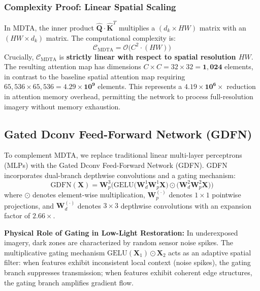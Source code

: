 \documentclass[10pt,twocolumn,letterpaper]{article}
\begin{document}
\subsubsection{Complexity Proof: Linear Spatial Scaling}
In MDTA, the inner product $\hat{\mathbf{Q}} \cdot \hat{\mathbf{K}}^T$ multiplies a $(d_k \times HW)$ matrix with an $(HW \times d_k)$ matrix. The computational complexity is:
\begin{equation}
\mathcal{C}_{\text{MDTA}} = \mathcal{O}\big( C^2 \cdot (HW) \big)
\end{equation}
Crucially, $\mathcal{C}_{\text{MDTA}}$ is \textbf{strictly linear with respect to spatial resolution $HW$}. The resulting attention map has dimensions $C \times C = 32 \times 32 = \mathbf{1,024}$ elements, in contrast to the baseline spatial attention map requiring $65,536 \times 65,536 = \mathbf{4.29 \times 10^9}$ elements. This represents a $\mathbf{4.19 \times 10^6 \times}$ reduction in attention memory overhead, permitting the network to process full-resolution imagery without memory exhaustion.

\subsection{Gated Dconv Feed-Forward Network (GDFN)}
To complement MDTA, we replace traditional linear multi-layer perceptrons (MLPs) with the Gated Dconv Feed-Forward Network (GDFN). GDFN incorporates dual-branch depthwise convolutions and a gating mechanism:
\begin{equation}
\text{GDFN}(\mathbf{X}) = \mathbf{W}_p^3 \Big( \text{GELU}\big( \mathbf{W}_d^1 \mathbf{W}_p^1 \mathbf{X} \big) \odot \big( \mathbf{W}_d^2 \mathbf{W}_p^2 \mathbf{X} \big) \Big)
\label{eq:gdfn}
\end{equation}
where $\odot$ denotes element-wise multiplication, $\mathbf{W}_p^{(\cdot)}$ denotes $1\times 1$ pointwise projections, and $\mathbf{W}_d^{(\cdot)}$ denotes $3\times 3$ depthwise convolutions with an expansion factor of $2.66\times$. 

\textbf{Physical Role of Gating in Low-Light Restoration:}
In underexposed imagery, dark zones are characterized by random sensor noise spikes. The multiplicative gating mechanism $\text{GELU}(\mathbf{X}_1) \odot \mathbf{X}_2$ acts as an adaptive spatial filter: when features exhibit inconsistent local context (noise spikes), the gating branch suppresses transmission; when features exhibit coherent edge structures, the gating branch amplifies gradient flow.
\end{document}
